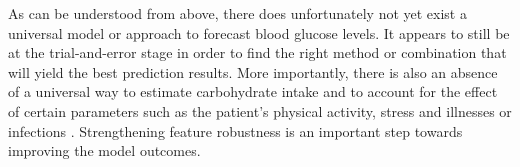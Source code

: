 As can be understood from above, there does unfortunately not yet exist a universal model or approach to forecast blood glucose levels. It appears to still be at the trial-and-error stage in order to find the right method or combination that will yield the best prediction results. More importantly, there is also an absence of a universal way to estimate carbohydrate intake and to account for the effect of certain parameters such as the patient's physical activity, stress and illnesses or infections \cite{woldaregay_data-driven_2019}. Strengthening feature robustness is an important step towards improving the model outcomes.




















